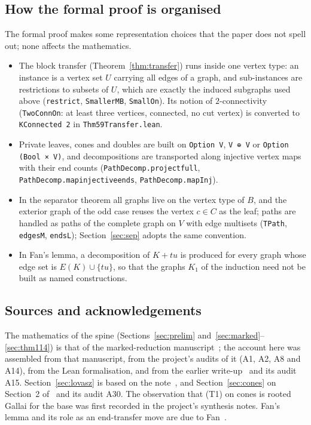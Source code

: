 \documentclass[11pt]{amsart}
\theoremstyle{definition}
\theoremstyle{remark}
\renewcommand{\_}{\oldunderscore\allowbreak}
\begin{document}
\subsection{How the formal proof is organised}
The formal proof makes some representation choices that the paper does not spell out; none affects
the mathematics.
\begin{itemize}
\item The block transfer (Theorem~\ref{thm:transfer}) runs inside one vertex type: an instance is a
vertex set $U$ carrying all edges of a graph, and sub-instances are restrictions to subsets of $U$,
which are exactly the induced subgraphs used above (\texttt{restrict}, \texttt{SmallerMB},
\texttt{SmallOn}). Its notion of $2$-connectivity (\texttt{TwoConnOn}: at least three vertices,
connected, no cut vertex) is converted to \texttt{KConnected 2} in \texttt{Thm59Transfer.lean}.
\item Private leaves, cones and doubles are built on \texttt{Option V}, \texttt{V ⊕ V} or
\texttt{Option (Bool × V)}, and decompositions are transported along injective vertex maps with their
end counts (\texttt{PathDecomp.project\_full}, \texttt{PathDecomp.map\_injective\_ends},
\texttt{PathDecomp.mapInj}).
\item In the separator theorem all graphs live on the vertex type of $B$, and the exterior graph of
the odd case reuses the vertex $c\in C$ as the leaf; paths are handled as paths of the complete graph
on $V$ with edge multisets (\texttt{TPath}, \texttt{edgesM}, \texttt{endsL}); Section~\ref{sec:sep}
adopts the same convention.
\item In Fan's lemma, a decomposition of $K+tu$ is produced for every graph whose edge set is
$E(K)\cup\{tu\}$, so that the graphs $K_1$ of the induction need not be built as named
constructions.
\end{itemize}

\subsection*{Sources and acknowledgements}
The mathematics of the spine (Sections~\ref{sec:prelim} and~\ref{sec:marked}--\ref{sec:thm114}) is
that of the marked-reduction manuscript~\cite{MR}; the account here was assembled from that
manuscript, from the project's audits of it (A1, A2, A8 and A14), from the Lean formalisation, and
from the earlier write-up~\cite{SP} and its audit A15. Section~\ref{sec:lovasz} is based on the
note~\cite{LF}, and Section~\ref{sec:cones} on Section~2 of~\cite{EC} and its audit A30. The
observation that (T1) on cones is rooted Gallai for the base was first recorded in the project's
synthesis notes. Fan's lemma and its role as an end-transfer move are due to Fan~\cite{Fan05}.
\end{document}
